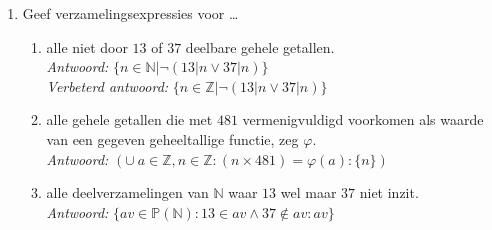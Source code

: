 \begin{enumerate}
\begin{enumerate}
\end{enumerate}

\item Geef verzamelingsexpressies voor \ldots
\begin{enumerate}

    \item alle niet door $13$ of $37$ deelbare gehele getallen. \\
        \emph{Antwoord:} $\{n \in \mathbb{N} | \neg ( 13 | n \vee 37 | n)\}$ \\
        \emph{Verbeterd antwoord:} $\{n \in \mathbb{Z} | \neg ( 13 | n \vee 37 | n)\}$ \\

    \item alle gehele getallen die met $481$ vermenigvuldigd  voorkomen als waarde van een gegeven geheeltallige functie, zeg $\varphi$. \\
        \emph{Antwoord:} $(\cup ~a \in \mathbb{Z}, n \in \mathbb{Z} : (n \times 481) = \varphi(a) : \{n\})$ \\

    \item alle deelverzamelingen van $\mathbb{N}$ waar $13$ wel maar $37$ niet inzit. \\
        \emph{Antwoord:} $\{av \in \mathbb{P}(\mathbb{N}) : 13 \in av \wedge 37 \notin av : av\}$ \\

\end{enumerate}
\end{enumerate}
